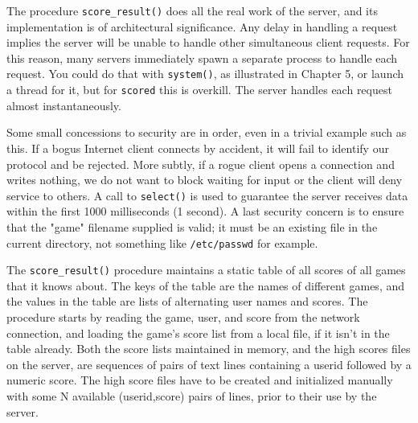 The procedure \texttt{score\_result()} does all the real work of the
server, and its implementation is of architectural significance. Any
delay in handling a request implies the server will be unable to
handle other simultaneous client requests. For this reason, many servers
immediately spawn a separate process to handle each request.
You could do that with \texttt{system()}, as illustrated in Chapter 5,
or launch a thread for it,
but for \texttt{scored} this is overkill. The server handles each
request almost instantaneously.

Some small concessions to security are in order, even in a trivial
example such as this. If a bogus Internet client connects by accident,
it will fail to identify our protocol and be rejected. More subtly, if
a rogue client opens a connection and writes nothing, we do not want to
block waiting for input or the client will deny service to others. A
call to \texttt{select()} is used to guarantee the server receives data within
the first 1000 milliseconds (1 second). A last security concern is to
ensure that the "game" filename supplied is
valid; it must be an existing file in the current directory, not
something like \texttt{/etc/passwd} for example.

The \texttt{score\_result()} procedure maintains a static table of all
scores of all games that it knows about. The keys of the table are the
names of different games, and the values in the table are lists of
alternating user names and scores. The procedure starts by reading the
game, user, and score from the network connection, and loading the
game's score list from a local file, if it
isn't in the table already. Both the score lists
maintained in memory, and the high scores files on the server, are
sequences of pairs of text lines containing a userid followed by a
numeric score. The high score files have to be created and initialized
manually with some N available (userid,score) pairs of lines, prior to
their use by the server.

